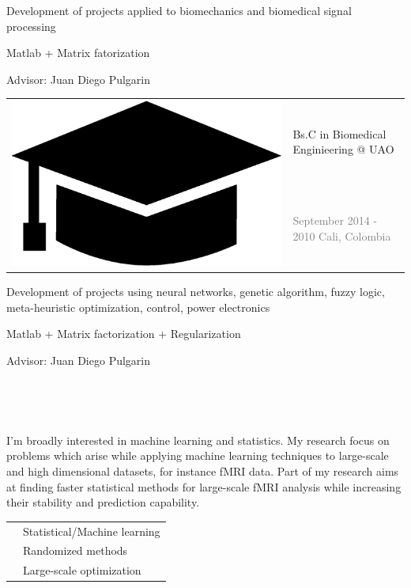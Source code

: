 \documentclass[letterpaper]{article}
\begin{document}
\begin{minipage}{1.\linewidth}
\begin{minipage}{0.47\linewidth}
\begin{minipage}{1\linewidth}
		{\small Development of projects applied to biomechanics and biomedical 
		signal processing
		
		\smallskip
		Matlab + Matrix fatorization
		
		\smallskip
		\textmd{Advisor:} Juan Diego Pulgarin}
	\end{minipage} %
	\begin{minipage}{1\linewidth} %
		\vspace{2ex}
		\begin{tabularx}{1\textwidth}{rX}				
			\multirow{2}{*}{\includegraphics[trim= 0.1cm 0.1cm 0.1cm 0.1cm, 
			clip=true, width=0.12\linewidth]{hat.eps}} & {\large Bs.C in 
			Biomedical Enginieering @ UAO}\\
			& {\small\textcolor{gray}{September 2014 - 2010 \hfill Cali, 
			Colombia}}
		\end{tabularx}
		\vspace{0.1ex}
		
		{\small Development of projects using neural networks, genetic 
		algorithm, fuzzy logic, meta-heuristic optimization, control, power 
		electronics
				
		\smallskip
		Matlab + Matrix factorization + Regularization
		
		\smallskip
		\textmd{Advisor:} Juan Diego Pulgarin}\\
	\end{minipage} %
	\begin{minipage}{1\linewidth}
		\vspace{2ex}
		\begin{minipage}{1\linewidth}
			\\
		\end{minipage}
		\begin{minipage}{1\linewidth}
			\vspace{2ex}
			{\small I'm broadly interested in machine learning and statistics. 
			My research focus on problems which arise while applying machine 	
			learning techniques to large-scale and high dimensional datasets,	
			for instance fMRI data. 
			Part of my research aims at finding faster statistical methods for 	
			large-scale	fMRI analysis while increasing their stability and 		
			prediction capability.\\
			
			\begin{tabularx}{1\textwidth}{rX}
			\faCircle & Statistical/Machine learning\\
			\faCircle & Randomized methods\\
			\faCircle & Large-scale optimization\\
			\end{tabularx}
			}
		\end{minipage}
	\end{minipage}
\end{minipage}
\end{minipage}
\end{document}
